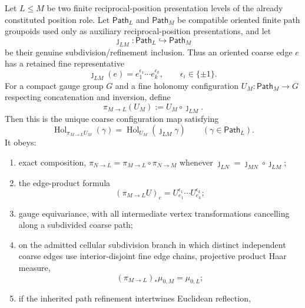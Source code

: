 \documentclass[12pt,a4paper]{article}
\begin{document}
\begin{theorem}
\label{p12:thm:v251-inherited-path-coarse-map}
Let $L\le M$ be two finite reciprocal-position presentation levels of the
already constituted position role.  Let $\mathsf{Path}_L$ and
$\mathsf{Path}_M$ be compatible oriented finite path groupoids used only as
auxiliary reciprocal-position presentations, and let
\[
 \jmath_{LM}:\mathsf{Path}_L\hookrightarrow\mathsf{Path}_M
\]
be their genuine subdivision/refinement inclusion.  Thus an oriented coarse
edge $e$ has a retained fine representative
\[
 \jmath_{LM}(e)=e_1^{\epsilon_1}\cdots e_k^{\epsilon_k},
 \qquad \epsilon_i\in\{\pm1\}.
\]
For a compact gauge group $G$ and a fine holonomy configuration
$U_M:\mathsf{Path}_M\to G$ respecting concatenation and inversion, define
\begin{equation}
\label{p12:eq:v251-holonomy-restriction}
 \boxed{\pi_{M\to L}(U_M):=U_M\circ\jmath_{LM}.}
\end{equation}
Then this is the unique coarse configuration map satisfying
\begin{equation}
\label{p12:eq:v251-evaluation-square}
 \operatorname{Hol}_{\pi_{M\to L}U_M}(\gamma)
 =\operatorname{Hol}_{U_M}(\jmath_{LM}\gamma)
 \qquad(\gamma\in\mathsf{Path}_L).
\end{equation}
It obeys:
\begin{enumerate}[label=\textnormal{(\roman*)},leftmargin=3em]
\item exact composition,
$\pi_{N\to L}=\pi_{M\to L}\circ\pi_{N\to M}$ whenever
$\jmath_{LN}=\jmath_{MN}\circ\jmath_{LM}$;
\item the edge-product formula
\begin{equation}
\label{p12:eq:v251-edge-product}
 (\pi_{M\to L}U)_e
 =U_{e_1}^{\epsilon_1}\cdots U_{e_k}^{\epsilon_k};
\end{equation}
\item gauge equivariance, with all intermediate vertex transformations
cancelling along a subdivided coarse path;
\item on the admitted cellular subdivision branch in which distinct
independent coarse edges use interior-disjoint fine edge chains, projective
product Haar measure,
\begin{equation}
\label{p12:eq:v251-haar-projective}
 (\pi_{M\to L})_*\mu_{0,M}=\mu_{0,L};
\end{equation}
\item if the inherited path refinement intertwines Euclidean reflection,

\end{enumerate}
\end{theorem}
\end{document}
